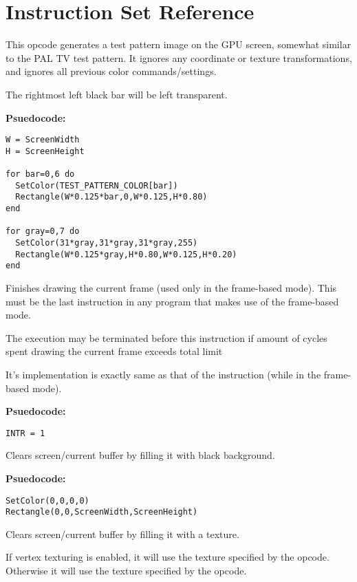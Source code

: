 \newpage

\section{Instruction Set Reference}

This opcode generates a test pattern image on the GPU screen, somewhat similar to the PAL TV test pattern. It ignores any coordinate or texture transformations, and ignores all previous color commands/settings.

The rightmost left black bar will be left transparent.

\textbf{Psuedocode:}
\begin{verbatim}
W = ScreenWidth
H = ScreenHeight
    
for bar=0,6 do
  SetColor(TEST_PATTERN_COLOR[bar])
  Rectangle(W*0.125*bar,0,W*0.125,H*0.80)
end
  
for gray=0,7 do
  SetColor(31*gray,31*gray,31*gray,255)
  Rectangle(W*0.125*gray,H*0.80,W*0.125,H*0.20)
end
\end{verbatim}


Finishes drawing the current frame (used only in the frame-based mode). This must be the last instruction in any program that makes use of the frame-based mode.

The execution may be terminated before this instruction if amount of cycles spent drawing the current frame exceeds total limit

It's implementation is exactly same as that of the  instruction (while in the frame-based mode).

\textbf{Psuedocode:}
\begin{verbatim}
INTR = 1
\end{verbatim}


Clears screen/current buffer by filling it with black background.

\textbf{Psuedocode:}
\begin{verbatim}
SetColor(0,0,0,0)
Rectangle(0,0,ScreenWidth,ScreenHeight)
\end{verbatim}


Clears screen/current buffer by filling it with a texture.

If vertex texturing is enabled, it will use the texture specified by the  opcode. Otherwise it will use the texture specified by the  opcode.

